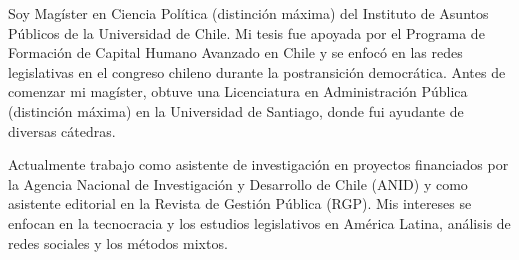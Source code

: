 




\par{Soy Magíster en Ciencia Política (distinción máxima) del Instituto de Asuntos Públicos de la Universidad de Chile. Mi tesis fue apoyada por el Programa de Formación de Capital Humano Avanzado en Chile y se enfocó en las redes legislativas en el congreso chileno durante la postransición democrática. Antes de comenzar mi magíster, obtuve una Licenciatura en Administración Pública (distinción máxima) en la Universidad de Santiago, donde fui ayudante de diversas cátedras.

Actualmente trabajo como asistente de investigación en proyectos financiados por la Agencia Nacional de Investigación y Desarrollo de Chile (ANID) y como asistente editorial en la Revista de Gestión Pública (RGP). Mis intereses se enfocan en la tecnocracia y los estudios legislativos en América Latina, análisis de redes sociales y los métodos mixtos.}\\
